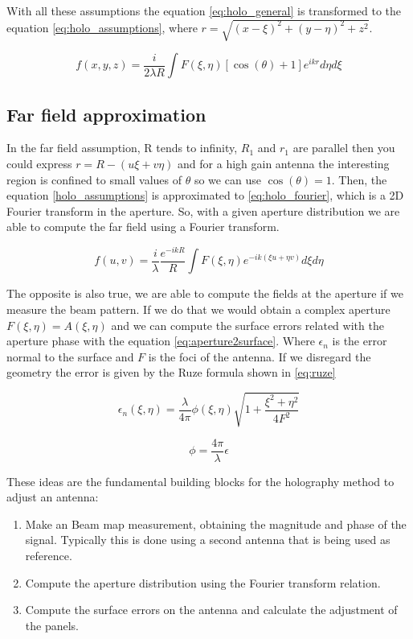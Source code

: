 With all these assumptions the equation \ref{eq:holo_general} is transformed to the equation \ref{eq:holo_assumptions}, where $r= \sqrt{(x-\xi)^2+(y-\eta)^2+z^2}$.

\begin{equation}
f(x,y,z) = \frac{i}{2\lambda R}\int F(\xi,\eta)[\cos(\theta)+1]e^{ikr}d\eta d\xi
    \label{eq:holo_assumptions}
\end{equation}


\subsection{Far field approximation}
In the far field assumption, R tends to infinity, $R_1$ and $r_1$ are parallel then you could express $r=R-(u\xi+v\eta)$ and for a high gain antenna the interesting region is confined to small values of $\theta$ so we can  use $\cos(\theta)=1$. Then,  the equation \ref{holo_assumptions} is approximated to \ref{eq:holo_fourier}, which is a 2D Fourier transform in the aperture. So, with a given aperture distribution we are able to compute the far field using a Fourier transform. 


\begin{equation}
    f(u,v) = \frac{i}{\lambda}\frac{e^{-ikR}}{R} \int F(\xi,\eta)e^{-ik(\xi u+\eta v)} d\xi d\eta
    \label{eq:holo_fourier}
\end{equation}


The opposite is also true, we are able to compute the fields at the aperture if we measure the beam pattern. If we do that we would obtain a complex aperture $F(\xi, \eta)=A(\xi, \eta)$ and we can compute the surface errors related with the aperture phase with the equation \ref{eq:aperture2surface}. Where $\epsilon_n$ is the error normal to the surface and $F$ is the foci of the antenna. If we disregard the geometry the error is given by the Ruze formula shown in \ref{eq:ruze}

\begin{equation}
    \epsilon_n(\xi,\eta) = \frac{\lambda}{4\pi} \phi(\xi,\eta)\sqrt{1+\frac{\xi^2+\eta^2}{4F^2}}
    \label{eq:aperture2surface}
\end{equation}


\begin{equation}
    \phi = \frac{4\pi}{\lambda}\epsilon
    \label{eq:ruze}
\end{equation}


These ideas are the fundamental building blocks for the holography method to adjust an antenna:
\begin{enumerate}
    \item Make an Beam map measurement, obtaining the magnitude and phase of the signal. Typically this is done using a second antenna that is being used as reference.
    \item Compute the aperture distribution using the Fourier transform relation.
    \item Compute the surface errors on the antenna and calculate the adjustment of the panels.
\end{enumerate}


